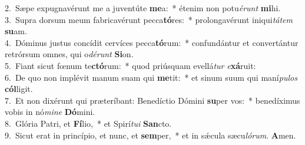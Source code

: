 {2.~}Sæpe expugnavérunt me a juventúte \textbf{me}a:~* étenim non potu\textit{é}\textit{runt} \textbf{mi}hi.\\
{3.~}Supra dorsum meum fabricavérunt pecca\textbf{tó}res:~* prolongavérunt iniqui\textit{tá}\textit{tem} \textbf{su}am.\\
{4.~}Dóminus justus concídit cervíces pecca\textbf{tó}rum:~* confundántur et convertántur retrórsum omnes, qui o\textit{dé}\textit{runt} \textbf{Si}on.\\
{5.~}Fiant sicut fœnum te\textbf{ctó}rum:~* quod priúsquam evellá\textit{tur} \textit{e}\textbf{xá}ruit:\\
{6.~}De quo non implévit manum suam qui \textbf{me}tit:~* et sinum suum qui maní\textit{pu}\textit{los} \textbf{cól}ligit.\\
{7.~}Et non dixérunt qui præteríbant: Benedíctio Dómini \textbf{su}per vos:~* benedíximus vobis in nó\textit{mi}\textit{ne} \textbf{Dó}mini.\\
{8.~}Glória Patri, et \textbf{Fí}lio,~* et Spirí\textit{tu}\textit{i} \textbf{San}cto.\\
{9.~}Sicut erat in princípio, et nunc, et \textbf{sem}per,~* et in sǽcula sæcu\textit{ló}\textit{rum}. \textbf{A}men.\\

